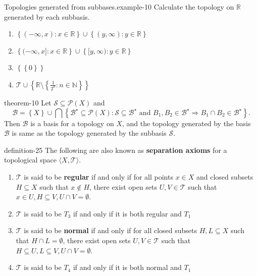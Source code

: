 \documentclass[10pt,]{article}
\newcommand{\terminology}[1]{\textbf{#1}}
\newcommand{\tuple}[1]{\langle #1 \rangle}
\newcommand{\mb}{\mathbb}
\newcommand{\mc}{\mathcal}
\newcommand{\setBuilder}[2]{\left\{#1:#2\right\}}
\newcommand{\setList}[1]{\left\{#1\right\}}
\begin{document}
\begin{example}{Topologies generated from subbases.}{example-10}%
\hypertarget{p-81}{}%
Calculate the topology on \(\mb R\) generated by each subbasis.%
\leavevmode%
\begin{enumerate}
\item\hypertarget{li-66}{}\(\setBuilder{(-\infty,x)}{x\in\mb R}\cup\setBuilder{(y,\infty)}{y\in\mb R}\)%
\item\hypertarget{li-67}{}\(\setBuilder{(-\infty,x]}{x\in\mb R}\cup\setBuilder{[y,\infty)}{y\in\mb R}\)%
\item\hypertarget{li-68}{}\(\setList{\setList{0}}\)%
\item\hypertarget{li-69}{}\(\mc T\cup\setList{\mb R\setminus\setBuilder{\frac{1}{2^n}}{n\in\mb N}}\)%
\end{enumerate}
\end{example}
\begin{theorem}{}{}{theorem-10}%
\hypertarget{p-82}{}%
Let \(\mc S\subseteq\mc P(X)\) and%
\begin{equation*}
\mc B=\setList{X}\cup\bigcap\setBuilder{\mc B^\star\subseteq\mc P(X)}
{\mc S\subseteq\mc B^\star\text{ and }
B_1,B_2\in\mc B^\star\Rightarrow B_1\cap B_2\in\mc B^\star}.
\end{equation*}
Then \(\mc B\) is a basis for a topology on \(X\), and the topology generated by the basis \(\mc B\) is same as the topology generated by the subbasis \(\mc S\).%
\end{theorem}
\begin{definition}{}{definition-25}%
\hypertarget{p-83}{}%
The following are also known as \terminology{separation axioms} for a topological space \(\tuple{X,\mc T}\).%
\leavevmode%
\begin{enumerate}
\item\hypertarget{li-70}{}\(\mc T\) is said to be \terminology{regular} if and only if for all points \(x\in X\) and closed subsets \(H\subseteq X\) such that \(x\not\in H\), there exist open sets \(U,V\in\mc T\) such that \(x\in U,H\subseteq V,U\cap V=\emptyset\).%
\item\hypertarget{li-71}{}\(\mc T\) is said to be \terminology{\(T_3\)} if and only if it is both regular and \(T_1\)%
\item\hypertarget{li-72}{}\(\mc T\) is said to be \terminology{normal} if and only if for all closed subsets \(H,L\subseteq X\) such that \(H\cap L=\emptyset\), there exist open sets \(U,V\in\mc T\) such that \(H\subseteq U,L\subseteq V,U\cap V=\emptyset\).%
\item\hypertarget{li-73}{}\(\mc T\) is said to be \terminology{\(T_4\)} if and only if it is both normal and \(T_1\)%
\end{enumerate}
\end{definition}
\end{document}
